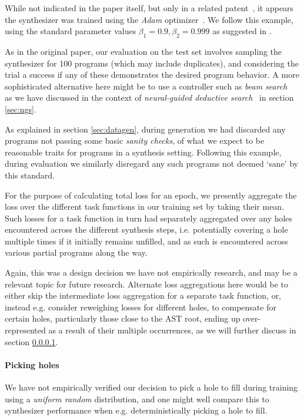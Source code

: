\documentclass{article}
\begin{document}
While not indicated in the paper itself,
but only in a related patent~\citep{mohamed2017neural},
it appears the synthesizer was trained using the \emph{Adam} optimizer~\citep{kingma2014adam}.
We follow this example,
using the standard parameter values $\beta_1=0.9, \beta_2=0.999$ as suggested in \citet{kingma2014adam}.

As in the original paper,
our evaluation on the test set involves sampling the synthesizer for 100 programs (which may include duplicates),
and considering the trial a success if any of these demonstrates the desired program behavior.
A more sophisticated alternative here might be to use a controller such as \emph{beam search}~\citep{polosukhin2018neural}
as we have discussed in the context of \emph{neural-guided deductive search}~\citep{deepcoder} in section \ref{sec:ngs}.

As explained in section \ref{sec:datagen},
during generation we had discarded any programs not passing some basic \emph{sanity checks},
of what we expect to be reasonable traits for programs in a synthesis setting.
Following this example, during evaluation we similarly disregard any such programs not deemed `sane' by this standard.

For the purpose of calculating total loss for an epoch,
we presently aggregate the loss over the different
task functions in our training set by taking their mean.
Such losses for a task function in turn had separately aggregated
over any holes encountered across the different synthesis steps,
i.e. potentially covering a hole multiple times if it initially remains unfilled,
and as such is encountered across various partial programs along the way.

Again, this was a design decision we have not empirically research,
and may be a relevant topic for future research.
Alternate loss aggregations here would be to either
skip the intermediate loss aggregation for a separate task function,
or, instead e.g. consider reweighing losses for different holes,
to compensate for certain holes, particularly those close to the AST root,
ending up over-represented as a result of their multiple occurrences,
as we will further discuss in section \ref{sec:picking}.

\paragraph{Picking holes} \label{sec:picking}

We have not empirically verified our decision to pick a hole to fill during training using a \emph{uniform random} distribution,
and one might well compare this to synthesizer performance when e.g. deterministically picking a hole to fill.
\end{document}
